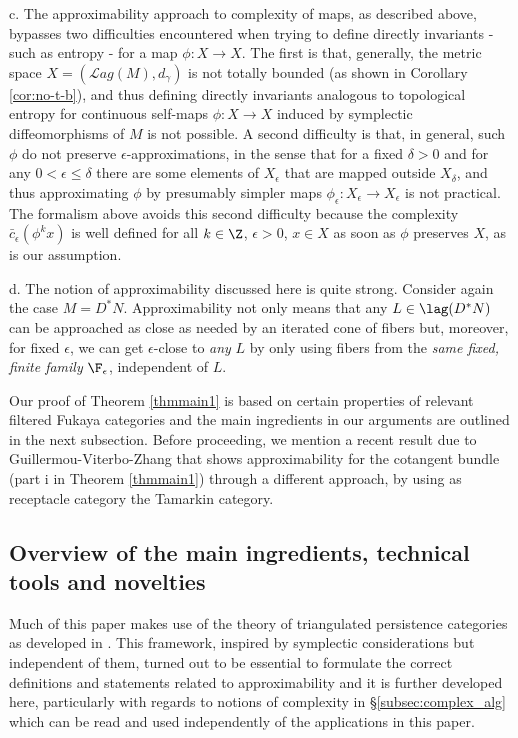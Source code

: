 \begin{rem}
c. The approximability approach to complexity of maps, as described above, bypasses two difficulties encountered when trying to define directly  invariants - such as entropy - for a map $\phi : X \to X$. The first is that, generally, the metric space $X=(\mathcal{L}ag(M), d_\gamma)$ is not totally bounded (as shown in
Corollary \ref{cor:no-t-b}), and thus defining directly invariants analogous to topological entropy for  continuous self-maps $\phi :X\to X$ induced by symplectic diffeomorphisms of $M$ is not possible. A  second difficulty is that, in general, such $\phi$ do not preserve $\epsilon$-approximations, in the sense that for a fixed $\delta>0$ and for any $0<\epsilon \leq \delta $ there are some elements of $X_{\epsilon}$ that are mapped  outside $X_{\delta}$, and thus approximating $\phi$ by presumably simpler maps $\phi_{\epsilon}:X_{\epsilon}\to X_{\epsilon}$ is not practical. The formalism above avoids this second difficulty because the complexity $\bar{c}_{\epsilon}(\phi^{k}x)$
is well defined for all $k\in \Z$, $\epsilon>0$, $x\in X$ as soon as $\phi$ preserves $X$, as is our assumption.

d. The notion of approximability discussed here is quite strong. Consider again the case $M=D^{\ast}N$.  Approximability not only  means that any $L\in\lag (D^{\ast}N)$ can be approached as close as needed by an iterated cone of fibers but, moreover, for fixed $\epsilon$, we can get $\epsilon$-close to {\em any} $L$  by only using fibers from the {\em same fixed, finite family} $\F_{\epsilon}$, independent of $L$. 
\end{rem}

Our proof of Theorem \ref{thmmain1} is based on certain properties of relevant filtered Fukaya categories and the main ingredients in our arguments are outlined in the next subsection.  Before proceeding, we mention  a recent result due to Guillermou-Viterbo-Zhang \cite{Gu-Vi-Zh:approx} that shows approximability for the cotangent bundle (part i in Theorem \ref{thmmain1}) through a different approach, by using as receptacle category  the Tamarkin category.

 


\subsection{Overview of the main ingredients, technical tools and novelties}
Much of this paper makes use of the theory of triangulated persistence categories as developed in \cite{BCZ:tpc}. This framework, inspired by symplectic considerations but independent of them,  turned out to be essential to formulate the correct definitions and statements related to approximability and it is further developed here, particularly with regards to notions of complexity in \S\ref{subsec:complex_alg} which can be read and used independently of the applications in this paper.  

